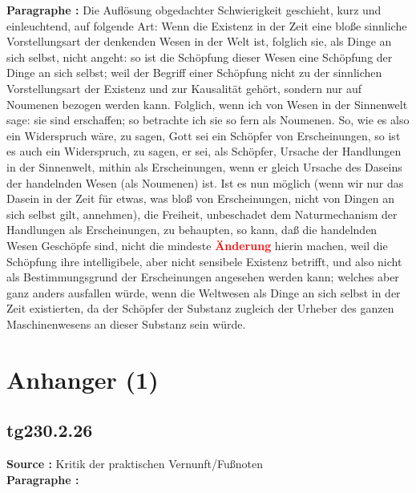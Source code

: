 \documentclass[a4paper,12pt,twoside]{book}
\newcommand{\match}[1]{\textcolor{red}{\textbf{#1}}}
\newcommand{\unnumberedsection}[1]{
	\section*{#1}
	\addcontentsline{toc}{section}{#1}
	\markright{#1}
}
\begin{document}
	\noindent\textbf{Paragraphe : }Die Auflösung obgedachter Schwierigkeit geschieht, kurz und einleuchtend, auf folgende Art: Wenn die Existenz in der Zeit eine bloße sinnliche Vorstellungsart der denkenden Wesen in der Welt ist, folglich sie, als Dinge an sich selbst, nicht angeht: so ist die Schöpfung dieser Wesen eine Schöpfung der Dinge an sich selbst; weil der Begriff einer Schöpfung nicht zu der sinnlichen Vorstellungsart der Existenz und zur Kausalität gehört, sondern nur auf Noumenen bezogen werden kann. Folglich, wenn ich von Wesen in der  Sinnenwelt sage: sie sind erschaffen; so betrachte ich sie so fern als Noumenen. So, wie es also ein Widerspruch wäre, zu sagen, Gott sei ein Schöpfer von Erscheinungen, so ist es auch ein Widerspruch, zu sagen, er sei, als Schöpfer, Ursache der Handlungen in der Sinnenwelt, mithin als Erscheinungen, wenn er gleich Ursache des Daseins der handelnden Wesen (als Noumenen) ist. Ist es nun möglich (wenn wir nur das Dasein in der Zeit für etwas, was bloß von Erscheinungen, nicht von Dingen an sich selbst gilt, annehmen), die Freiheit, unbeschadet dem Naturmechanism der Handlungen als Erscheinungen, zu behaupten, so kann, daß die handelnden Wesen Geschöpfe sind, nicht die mindeste \match{Änderung} hierin machen, weil die Schöpfung ihre intelligibele, aber nicht sensibele Existenz betrifft, und also nicht als Bestimmungsgrund der Erscheinungen angesehen werden kann; welches aber ganz anders ausfallen würde, wenn die Weltwesen als Dinge an sich selbst in der Zeit existierten, da der Schöpfer der Substanz zugleich der Urheber des ganzen Maschinenwesens an dieser Substanz sein würde. 
	
	\unnumberedsection{Anhanger (1)} 
	\subsection*{tg230.2.26} 
	\textbf{Source : }Kritik der praktischen Vernunft/Fußnoten\\  
	
	\noindent\textbf{Paragraphe : }
	
\end{document}
